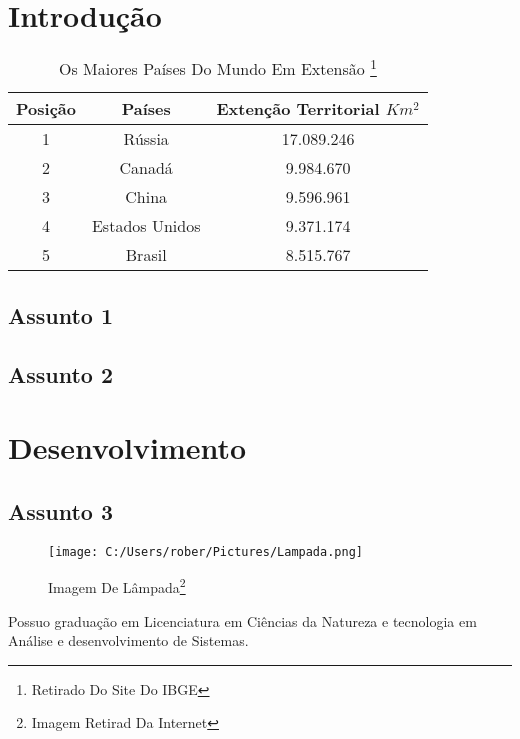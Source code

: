 \documentclass[a4paper,12pt, oneside]{book}
\begin{document}
\tableofcontents
\listoffigures %
\listoftables %
\newpage

\chapter{Introdução}

\begin{table}[h]
\centering
\caption{Os Maiores Países Do Mundo Em Extensão \cite{IBGE}\footnote{Retirado Do Site Do IBGE}}
\vspace{0.5cm}
	\begin{tabular}{c|cc}
		Posição & Países & Extenção Territorial $Km^2$\\ \hline
		1 & Rússia & 17.089.246\\
		2 & Canadá & 9.984.670\\
		3 & China & 9.596.961\\
		4 & Estados Unidos & 9.371.174\\
		5 & Brasil & 8.515.767
	\end{tabular}
\end{table}

\section{Assunto 1}
\section{Assunto 2}

\chapter{Desenvolvimento}
\section{Assunto 3}

	\begin{figure}[h]
	\centering
	\texttt{[image: C:/Users/rober/Pictures/Lampada.png]}
	\caption{Imagem De Lâmpada\cite{FARIAS}\footnote{Imagem Retirad Da Internet}}\label{FigLampada}
	\end{figure}

\vspace{2cm}

Possuo  graduação  em Licenciatura em Ciências da Natureza e tecnologia em  Análise e desenvolvimento de Sistemas.
	
\end{document}
